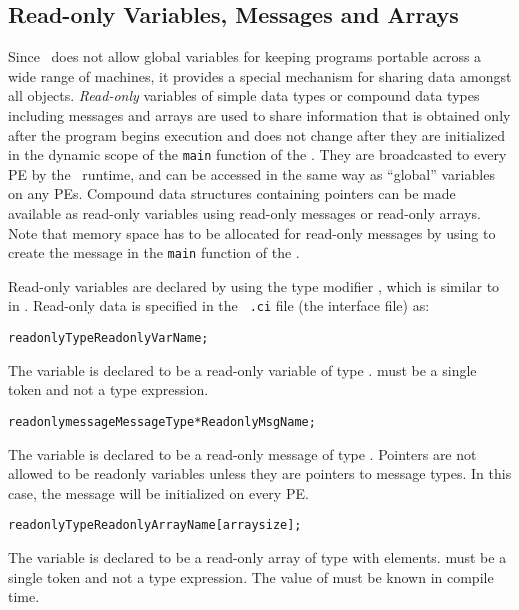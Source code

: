\subsection{Read-only Variables, Messages and Arrays}

\label{readonly}

Since \charmpp\ does not allow global variables for keeping programs portable
across a wide range of machines, it provides a special mechanism for sharing
data amongst all objects. {\it Read-only} variables of simple data types or
compound data types including messages and arrays are used to share information
that is obtained only after the program begins execution and does not change
after they are initialized in the dynamic scope of the {\tt main} function of
the . They are broadcasted to every PE by the \charmpp\ runtime,
and can be accessed in the same way as \CC ``global'' variables on any PEs.
Compound data structures containing pointers can be made available as read-only
variables using read-only messages or read-only arrays.  Note that memory space
has to be allocated for read-only messages by using  to create the
message in the {\tt main} function of the . 

Read-only variables are declared by using the type modifier ,
which is similar to  in \CC. Read-only data is specified in the {\tt
.ci} file (the interface file) as: 

\begin{alltt}
 readonly Type ReadonlyVarName;
\end{alltt}

The variable  is declared to be a read-only variable of
type .  must be a single token and not a type expression.

\begin{alltt}
 readonly message MessageType *ReadonlyMsgName;
\end{alltt}

The variable  is declared to be a read-only message of type
. Pointers are not allowed to be readonly variables unless they
are pointers to message types. In this case, the message will be initialized on
every PE.

\begin{alltt}
 readonly Type ReadonlyArrayName [arraysize];
\end{alltt}

The variable  is declared to be a read-only array of type
 with  elements.  must be a single token and
not a type expression. The value of  must be known in compile
time.

